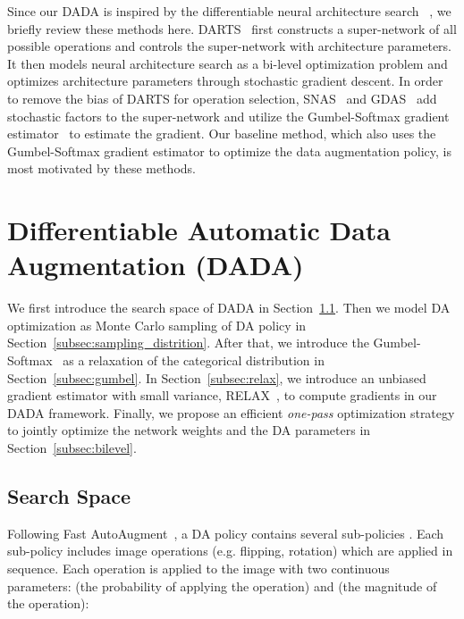 \documentclass[runningheads]{llncs}
\begin{document}
Since our  DADA is inspired by the differentiable neural architecture search ~\cite{DBLP:conf/iclr/LiuSY19, DBLP:conf/iclr/XieZLL19, Dong_2019_CVPR}, we briefly review these methods here. DARTS~\cite{DBLP:conf/iclr/LiuSY19} first constructs a super-network of all possible operations and controls the super-network with architecture parameters. It then models neural architecture search as a bi-level optimization problem and optimizes  architecture parameters through stochastic gradient descent. In order to remove the bias of DARTS for operation selection, SNAS~\cite{DBLP:conf/iclr/XieZLL19} and GDAS~\cite{Dong_2019_CVPR} add stochastic factors to the super-network and utilize the Gumbel-Softmax gradient estimator~\cite{DBLP:conf/iclr/MaddisonMT17, DBLP:conf/iclr/JangGP17} to estimate the gradient. Our baseline method, which also uses the Gumbel-Softmax gradient estimator to optimize the data augmentation policy, is most motivated by these methods.
 
\section{Differentiable Automatic Data Augmentation (DADA)}
\label{sec:method}
We first introduce the search space of DADA in Section~\ref{subsec:search_space}. Then we model DA optimization as Monte Carlo sampling of DA policy in Section~\ref{subsec:sampling_distrition}. After that, we introduce the Gumbel-Softmax~\cite{DBLP:conf/iclr/JangGP17, DBLP:conf/iclr/MaddisonMT17} as a relaxation of the categorical distribution in Section~\ref{subsec:gumbel}. In Section~\ref{subsec:relax}, we introduce an unbiased gradient estimator with small variance, RELAX~\cite{DBLP:conf/iclr/GrathwohlCWRD18}, to compute gradients in our DADA framework.
Finally, we propose an efficient \emph{one-pass} optimization strategy to jointly optimize the network weights and the DA parameters in Section~\ref{subsec:bilevel}.



\subsection{Search Space}
\label{subsec:search_space}


	Following 
	Fast AutoAugment~\cite{DBLP:conf/nips/LimKKKK19},  a DA policy  contains several sub-policies . Each sub-policy  includes  image operations (e.g. flipping, rotation)
 which are 
	applied in sequence. 
Each 
	operation  is applied to the image  with 
	two continuous parameters:  (the probability of applying the operation) and  (the magnitude of the operation): 
\end{document}
